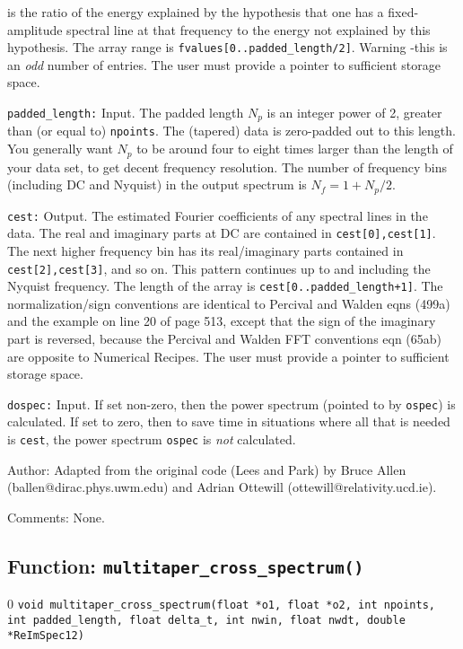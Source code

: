\begin{description}
  is the ratio of the energy explained by the hypothesis that one
  has a fixed-amplitude spectral line at that frequency to the
  energy not explained by this hypothesis.  The array range is 
  {\tt fvalues[0..padded\_length/2]}.  
  Warning -this is an {\it odd} number of entries.
  The user must provide a pointer to sufficient storage space.
\item{\tt padded\_length:} Input.  
  The padded length $N_p$ is an integer power of 2, 
  greater than (or equal to) {\tt npoints}.  
  The (tapered) data is zero-padded out to this
  length.  You generally want $N_p$ to be around four to eight
  times larger than the length of your data set, to get decent frequency
  resolution.  The number of frequency bins (including DC and Nyquist)
  in the output spectrum is $N_f=1+N_p/2$.
\item{\tt cest:} Output.  The estimated Fourier coefficients of any
  spectral lines in the data.  The real and imaginary parts at DC are
  contained in {\tt cest[0],cest[1]}.  The next higher frequency bin has
  its real/imaginary parts contained in {\tt cest[2],cest[3]}, and so on.
  This pattern continues up to and including the Nyquist frequency.  The
  length of the array is {\tt cest[0..padded\_length+1]}.  
  The normalization/sign
  conventions are identical to Percival and Walden eqns (499a) and the
  example on line 20 of page 513, except that the sign of the imaginary
  part is reversed, because the Percival and Walden FFT conventions eqn
  (65ab) are opposite to Numerical Recipes.  The user must provide a
  pointer to sufficient storage space.
\item{\tt dospec:} Input.  If set non-zero, then the power spectrum
  (pointed to by {\tt ospec}) is calculated.  If set to zero, then to
  save time in situations where all that is needed is {\tt cest}, the
  power spectrum {\tt ospec} is {\it not} calculated.
\end{description}
\begin{description}
\item{Author:}
Adapted from the original code (Lees and Park) by Bruce Allen (ballen@dirac.phys.uwm.edu)
and Adrian Ottewill (ottewill@relativity.ucd.ie).
\item{Comments:}
None.
\end{description}
\clearpage

\subsection{Function: {\tt multitaper\_cross\_spectrum()} }
\setcounter{equation}0
{\tt void multitaper\_cross\_spectrum(float *o1, float *o2, int npoints,
int padded\_length, float delta\_t, int nwin, float nwdt, double *ReImSpec12)}

